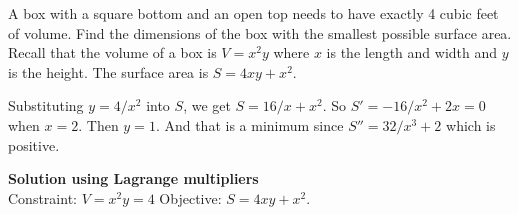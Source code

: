 \documentclass[12pt,answers]{exam}
\newcommand{\ds}{\displaystyle}
\begin{document}
\begin{questions}
\question A box with a square bottom and an open top needs to have exactly 4 cubic feet of volume.  Find the dimensions of the box with the smallest possible surface area.  Recall that the volume of a box is $V = x^2 y$ where $x$ is the length and width and $y$ is the height.  The surface area is $S = 4xy + x^2$.  
\begin{solution}
Substituting $y = 4/x^2$ into $S$, we get $S = 16/x + x^2$.  So $S' = -16/x^2 + 2x = 0$ when $x = 2$. Then $y = 1$.  And that is a minimum since $S'' = 32/x^3 + 2$ which is positive.  

\textbf{Solution using Lagrange multipliers} \\
Constraint: $V = x^2 y = 4$
Objective: $S = 4xy + x^2$. 
\end{solution}
\vfill
\vfill

\end{questions}

%
%
%
%
%
%
%
\end{document}
